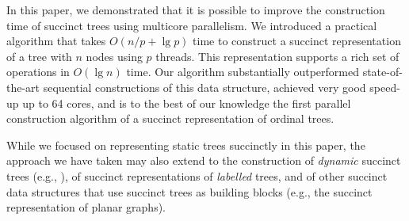 In this paper, we demonstrated that it is possible to improve the construction
time of succinct trees using multicore parallelism.
We introduced a practical algorithm that takes $O(n/p+\lg p)$ time to construct
a succinct representation of a tree with $n$ nodes using $p$ threads.
This representation supports a rich set of operations in $O(\lg n)$ time.
Our algorithm substantially outperformed state-of-the-art sequential
constructions of this data structure, achieved very good speed-up up to 64
cores, and is to the best of our knowledge the first parallel construction
algorithm of a succinct representation of ordinal trees.

While we focused on representing static trees succinctly in this paper, the
approach we have taken may also extend to the construction of \emph{dynamic}
succinct trees (e.g., \cite{Navarro:2014:FFS:2620785.2601073}), of succinct
representations of \emph{labelled} trees, and of other succinct data structures
that use succinct trees as building blocks (e.g., the succinct representation of
planar graphs).
